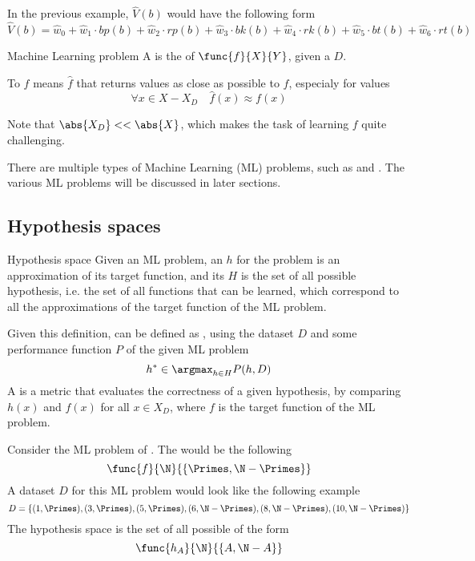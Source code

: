 \documentclass[a4paper, 12pt]{report}
\begin{document}
    In the previous example, $\hat V(b)$ would have the following form $$\hat V(b) = \hat w_0 + \hat w_1 \cdot bp(b) + \hat w_2 \cdot rp(b) + \hat w_3 \cdot bk(b) + \hat w_4 \cdot rk(b) + \hat w_5 \cdot bt(b) + \hat w_6 \cdot rt(b)$$

    \begin{frameddefn}{Machine Learning problem}
        A  is the  of  $\func{f}{X}{Y}$, given a  $D$.

        To  $f$ means  $\hat f$ that returns values as close as possible to $f$, especialy for values  $$\forall x \in  X - X_D \quad \hat f(x) \approx f(x)$$
    \end{frameddefn}

    Note that $\abs{X_D} << \abs{X}$, which makes the task of learning $f$ quite challenging.

    There are multiple types of Machine Learning (ML) problems, such as  and . The various ML problems will be discussed in later sections.

    \subsection{Hypothesis spaces}
    
    \begin{frameddefn}{Hypothesis space}
        Given an ML problem, an  $h$ for the problem is an approximation of its target function, and its  $H$ is the set of all possible hypothesis, i.e. the set of all functions that can be learned, which correspond to all the approximations of the target function of the ML problem.
    \end{frameddefn}

    Given this definition,  can be defined as , using the dataset $D$ and some performance function $P$ of the given ML problem $$h^* \in \argmax_{h \in H}{P(h, D)}$$ A  is a metric that evaluates the correctness of a given hypothesis, by comparing $h(x)$ and $f(x)$ for all $x \in X_D$, where $f$ is the target function of the ML problem.

    \begin{example}[Hypothesis]
        Consider the ML problem of . The  would be the following $$\func{f}{\N}{\{\Primes, \N - \Primes\}}$$ A dataset $D$ for this ML problem would look like the following example $$D = \{(1, \Primes), (3, \Primes), (5, \Primes), (6, \N - \Primes), (8, \N - \Primes), (10, \N - \Primes)\}$$ The hypothesis space is the set of all possible  of the form $$\func{h_A}{\N}{\{A, \N - A\}}$$
    \end{example}
\end{document}
